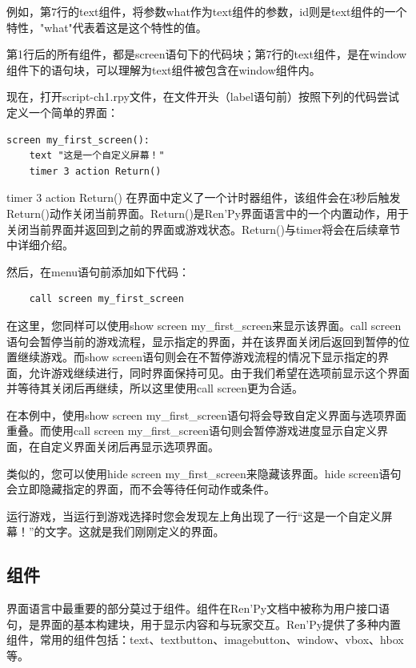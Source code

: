 \documentclass[../../Main.tex]{subfiles}
\begin{document}
例如，第7行的text组件，将参数what作为text组件的参数，id则是text组件的一个特性，"what"代表着这是这个特性的值。

第1行后的所有组件，都是screen语句下的代码块；第7行的text组件，是在window组件下的语句块，可以理解为text组件被包含在window组件内。

现在，打开script-ch1.rpy文件，在文件开头（label语句前）按照下列的代码尝试定义一个简单的界面：
\begin{lstlisting}
screen my_first_screen():
    text "这是一个自定义屏幕！"
    timer 3 action Return()
\end{lstlisting}

\begin{ExtraKnowledge}
    
    timer 3 action Return() 在界面中定义了一个计时器组件，该组件会在3秒后触发Return()动作关闭当前界面。Return()是Ren'Py界面语言中的一个内置动作，用于关闭当前界面并返回到之前的界面或游戏状态。Return()与timer将会在后续章节中详细介绍。
\end{ExtraKnowledge}

然后，在menu语句前添加如下代码：
\begin{lstlisting}
    call screen my_first_screen
\end{lstlisting}

在这里，您同样可以使用show screen my\_first\_screen来显示该界面。call screen语句会暂停当前的游戏流程，显示指定的界面，并在该界面关闭后返回到暂停的位置继续游戏。而show screen语句则会在不暂停游戏流程的情况下显示指定的界面，允许游戏继续进行，同时界面保持可见。由于我们希望在选项前显示这个界面并等待其关闭后再继续，所以这里使用call screen更为合适。

在本例中，使用show screen my\_first\_screen语句将会导致自定义界面与选项界面重叠。而使用call screen my\_first\_screen语句则会暂停游戏进度显示自定义界面，在自定义界面关闭后再显示选项界面。

类似的，您可以使用hide screen my\_first\_screen来隐藏该界面。hide screen语句会立即隐藏指定的界面，而不会等待任何动作或条件。

运行游戏，当运行到游戏选择时您会发现左上角出现了一行“这是一个自定义屏幕！”的文字。这就是我们刚刚定义的界面。

\subsection{组件}
界面语言中最重要的部分莫过于组件。组件在Ren'Py文档中被称为用户接口语句，是界面的基本构建块，用于显示内容和与玩家交互。Ren'Py提供了多种内置组件，常用的组件包括：text、textbutton、imagebutton、window、vbox、hbox等。
\end{document}

